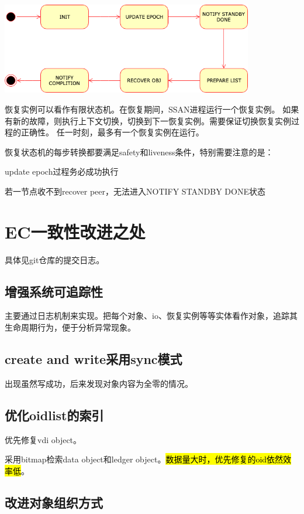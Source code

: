 \includegraphics[width=11cm]{../imgs/recovery-fsm.png}

恢复实例可以看作有限状态机。在恢复期间，SSAN进程运行一个恢复实例。
如果有新的故障，则执行上下文切换，切换到下一恢复实例。需要保证切换恢复实例过程的正确性。
任一时刻，最多有一个恢复实例在运行。

恢复状态机的每步转换都要满足safety和liveness条件，特别需要注意的是：
\begin{enumbox}
\item update epoch过程务必成功执行
\item 若一节点收不到recover peer，无法进入NOTIFY STANDBY DONE状态
\end{enumbox}

\section{EC一致性改进之处}

具体见git仓库的提交日志。

\subsection{增强系统可追踪性}

主要通过日志机制来实现。把每个对象、io、恢复实例等等实体看作对象，追踪其生命周期行为，便于分析异常现象。

\subsection{create and write采用sync模式}

出现虽然写成功，后来发现对象内容为全零的情况。

\subsection{优化oidlist的索引}

优先修复vdi object。

采用bitmap检索data object和ledger object。\hl{数据量大时，优先修复的oid依然效率低}。

\subsection{改进对象组织方式}

